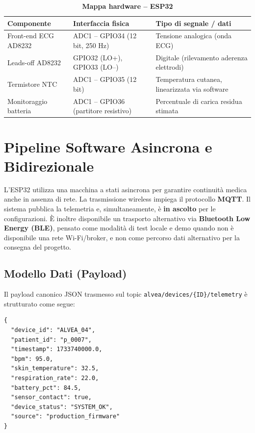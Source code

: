 \documentclass[11pt,a4paper]{article}
\begin{document}
\begin{table}[h]
\centering
\caption*{\textbf{Mappa hardware -- ESP32}}
\small
\begin{tabularx}{\textwidth}{@{}lY Y@{}}
\toprule
\textbf{Componente} & \textbf{Interfaccia fisica} & \textbf{Tipo di segnale / dati} \\
\midrule
Front-end ECG AD8232 & ADC1 -- GPIO34 (12 bit, 250 Hz) & Tensione analogica (onda ECG) \\
Leads-off AD8232 & GPIO32 (LO+), GPIO33 (LO--) & Digitale (rilevamento aderenza elettrodi) \\
Termistore NTC & ADC1 -- GPIO35 (12 bit) & Temperatura cutanea, linearizzata via software \\
Monitoraggio batteria & ADC1 -- GPIO36 (partitore resistivo) & Percentuale di carica residua stimata \\
\bottomrule
\end{tabularx}
\end{table}

\newpage
\section{Pipeline Software Asincrona e Bidirezionale}

L'ESP32 utilizza una macchina a stati asincrona per garantire continuità medica anche in assenza di rete. La trasmissione wireless impiega il protocollo \textbf{MQTT}. Il sistema pubblica la telemetria e, simultaneamente, è \textbf{in ascolto} per le configurazioni. È inoltre disponibile un trasporto alternativo via \textbf{Bluetooth Low Energy (BLE)}, pensato come modalità di test locale e demo quando non è disponibile una rete Wi-Fi/broker, e non come percorso dati alternativo per la consegna del progetto.

\subsection{Modello Dati (Payload)}
Il payload canonico JSON trasmesso sul topic \texttt{alvea/devices/\{ID\}/telemetry} è strutturato come segue:

\begin{verbatim}
{
  "device_id": "ALVEA_04",
  "patient_id": "p_0007",
  "timestamp": 1733740000.0,
  "bpm": 95.0,
  "skin_temperature": 32.5,
  "respiration_rate": 22.0,
  "battery_pct": 84.5,
  "sensor_contact": true,
  "device_status": "SYSTEM_OK",
  "source": "production_firmware"
}
\end{verbatim}
\end{document}
